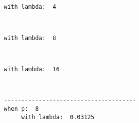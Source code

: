 \documentclass[11pt]{article}
\begin{document}
    \begin{center}
    \end{center}
    { \hspace*{\fill} \\}
    
    \begin{Verbatim}[commandchars=\\\{\}]
     with lambda:  4

    \end{Verbatim}

    \begin{center}
    \end{center}
    { \hspace*{\fill} \\}
    
    \begin{Verbatim}[commandchars=\\\{\}]
     with lambda:  8

    \end{Verbatim}

    \begin{center}
    \end{center}
    { \hspace*{\fill} \\}
    
    \begin{Verbatim}[commandchars=\\\{\}]
     with lambda:  16

    \end{Verbatim}

    \begin{center}
    \end{center}
    { \hspace*{\fill} \\}
    
    \begin{Verbatim}[commandchars=\\\{\}]
--------------------------------------
when p:  8
     with lambda:  0.03125

    \end{Verbatim}

    \begin{center}
    \end{center}
    { \hspace*{\fill} \\}
    
\end{document}
